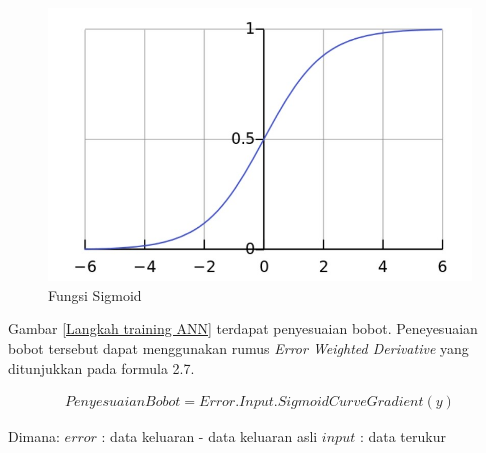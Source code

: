 \begin{figure}[H]
	\vspace{-0.1cm}
	\begin{center}
		\includegraphics[width=0.9\columnwidth]{bab2/Gambar/Fungsi Sigmoid.jpg}
	\end{center}
	\vspace{-0.2cm}
	\caption{Fungsi Sigmoid}\label{Fungsi Sigmoid}
\end{figure}


Gambar \ref{Langkah training ANN} terdapat penyesuaian bobot. Peneyesuaian bobot tersebut dapat menggunakan rumus \textit{Error Weighted Derivative} yang ditunjukkan pada formula 2.7.

\begin{equation}
	\begin{aligned}
		Penyesuaian Bobot = Error.Input.SigmoidCurveGradient(y)
	\end{aligned}
\end{equation}

Dimana:
\newline
$error$ 		\hspace{0.4cm}: data keluaran - data keluaran asli \newline
$input$ 	\hspace{0.4cm}: data terukur \newline

